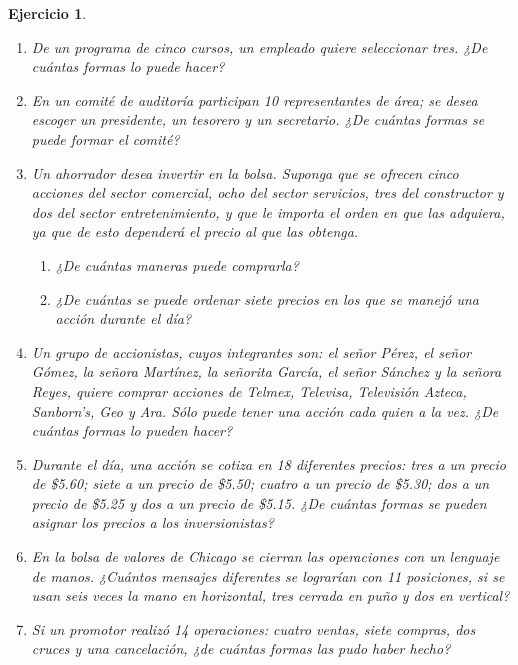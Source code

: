 \documentclass[12pt,twoside]{article}
\newtheorem{Ejer}{Ejercicio}
\begin{document}
\begin{Ejer}
\begin{enumerate}

\item De un programa de cinco cursos, un empleado quiere seleccionar tres. ¿De cuántas formas lo puede hacer?

\item En un comité de auditoría participan 10 representantes de área; se desea escoger un presidente, un tesorero y un secretario. ¿De cuántas formas se puede formar el comité?

\item Un ahorrador desea invertir en la bolsa. Suponga que se ofrecen cinco acciones del sector comercial, ocho del sector servicios, tres del constructor y dos del sector entretenimiento, y que le importa el orden en que las adquiera, ya que de esto dependerá el precio al que las obtenga.
\begin{enumerate}
\item ¿De cuántas maneras puede comprarla?
\item ¿De cuántas se puede ordenar siete precios en los que se manejó una acción durante el día?
\end{enumerate}

\item Un grupo de accionistas, cuyos integrantes son: el señor Pérez, el señor Gómez, la señora Martínez, la señorita García, el señor Sánchez y la señora Reyes, quiere comprar acciones de Telmex, Televisa, Televisión Azteca, Sanborn's, Geo y Ara. Sólo puede tener una acción cada quien a la vez. ¿De cuántas formas lo pueden hacer?

\item Durante el día, una acción se cotiza en 18 diferentes precios: tres a un precio de \$5.60; siete a un precio de \$5.50; cuatro a un precio de \$5.30; dos a un precio de \$5.25 y dos a un precio de \$5.15. ¿De cuántas formas se pueden asignar los precios a los inversionistas?

\item En la bolsa de valores de Chicago se cierran las operaciones con un lenguaje de manos. ¿Cuántos mensajes diferentes se lograrían con 11 posiciones, si se usan seis veces la mano en horizontal, tres cerrada en puño y dos en vertical?

\item Si un promotor realizó 14 operaciones: cuatro ventas, siete compras, dos cruces y una cancelación, ¿de cuántas formas las pudo haber hecho?


\end{enumerate}
\end{Ejer}
\end{document}

